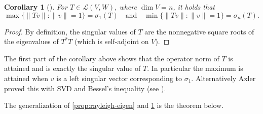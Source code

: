 \documentclass[11pt]{article}
\numberwithin{equation}{section}
\theoremstyle{plain-star}
\newtheorem{cor}[equation]{Corollary}
\theoremstyle{definition-star}
\theoremstyle{remark-star}
\theoremstyle{plain-star}
\newcommand{\nm}[1]{\lVert #1 \rVert}
\newcommand{\LVW}{\mathcal{L}(V,W)}
\begin{document}
\begin{cor}[{\cite[Exercise~7E.4]{axler2024}}]\label{cor:rayleigh-sing}
    For $T \in \LVW$, where $\dim V = n$, it holds that \[
        \max\{\nm{Tv}:\nm{v} = 1\} = \sigma_1(T)\quad \text{and}\quad \min\{\nm{Tv}:\nm{v} = 1\} = \sigma_n(T).
    \]
\end{cor}
\begin{proof}
    By definition, the singular values of $T$ are the nonnegative square roots of the eigenvalues of $T^*T$ (which is self-adjoint on $V$).
\end{proof}
The first part of the corollary above shows that the operator norm of $T$ is attained and is exactly the singular value of $T$. In particular the maximum is attained when $v$ is a left singular vector corresponding to $\sigma_1$. Alternatively Axler proved this with SVD and Bessel's inequality (see \cite[Section 7F]{axler2024}).

The generalization of \cref{prop:rayleigh-eigen} and \cref{cor:rayleigh-sing} is the theorem below.
\end{document}
